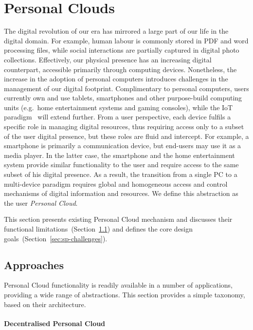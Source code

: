 \section{Personal Clouds}\label{sec:signpost-introduction}

The digital revolution of our era has mirrored a large part of our life in the
digital domain. For example, human labour is commonly stored in PDF and word
processing files, while social interactions are partially captured in digital
photo collections.  Effectively, our physical presence has an increasing digital
counterpart, accessible primarily through computing devices.  Nonetheless, the
increase in the adoption of personal computers introduces challenges in the
management of our digital footprint.  Complimentary to personal computers, users
currently own and use tablets, smartphones and other purpose-build computing
units (e.g.~home entertainment systems and gaming consoles), while the IoT
paradigm~ will extend further.  From a user perspective, each
device fulfils a specific role in managing digital resources, thus requiring
access only to a subset of the user digital presence, but these roles are fluid
and intercept.  For example, a smartphone is primarily a communication device,
but end-users may use it as a media player. In the latter case, the smartphone
and the home entertainment system provide similar functionality to the user and
require access to the same subset of his digital presence. As a result, the
transition from a single PC to a multi-device paradigm requires global and
homogeneous access and control mechanisms of digital information and
resources. We define this abstraction as the user \emph{Personal Cloud}. 

This section presents existing Personal Cloud mechanism and discusses their
functional limitations~(Section~\ref{sec:sp-approaches}) and defines the core
\signpost design goals~(Section~\ref{sec:sp-challenges}). 

\subsection{Approaches} \label{sec:sp-approaches}

Personal Cloud functionality is readily available in a number of applications,
providing a wide range of abstractions. This section provides a simple taxonomy,
based on their architecture. 

\paragraph*{Decentralised Personal Cloud}

